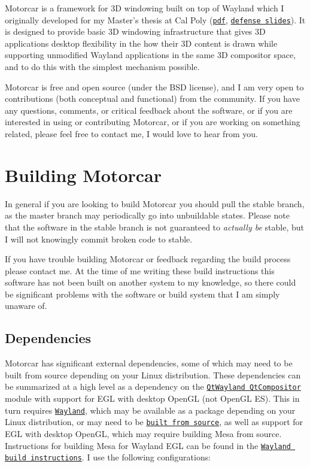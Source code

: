 Motorcar is a framework for 3\-D windowing built on top of Wayland which I originally developed for my Master's thesis at Cal Poly (\href{https://github.com/evil0sheep/MastersThesis/blob/master/thesis.pdf?raw=true}{\tt pdf}, \href{https://docs.google.com/presentation/d/1svgGMxxbfmcHy_KuS5Q9hah8PQOsXqvjBKOoMIzW24Y/edit?usp=sharing}{\tt defense slides}). It is designed to provide basic 3\-D windowing infrastructure that gives 3\-D applications desktop flexibility in the how their 3\-D content is drawn while supporting unmodified Wayland applications in the same 3\-D compositor space, and to do this with the simplest mechanism possible.

Motorcar is free and open source (under the B\-S\-D license), and I am very open to contributions (both conceptual and functional) from the community. If you have any questions, comments, or critical feedback about the software, or if you are interested in using or contributing Motorcar, or if you are working on something related, please feel free to contact me, I would love to hear from you.

\section*{Building Motorcar }

In general if you are looking to build Motorcar you should pull the stable branch, as the master branch may periodically go into unbuildable states. Please note that the software in the stable branch is not guaranteed to {\itshape actually be} stable, but I will not knowingly commit broken code to stable.

If you have trouble building Motorcar or feedback regarding the build process please contact me. At the time of me writing these build instructions this software has not been built on another system to my knowledge, so there could be significant problems with the software or build system that I am simply unaware of.

\subsection*{Dependencies }

Motorcar has significant external dependencies, some of which may need to be built from source depending on your Linux distribution. These dependencies can be summarized at a high level as a dependency on the \href{http://qt-project.org/wiki/QtWayland}{\tt Qt\-Wayland Qt\-Compositor} module with support for E\-G\-L with desktop Open\-G\-L (not Open\-G\-L E\-S). This in turn requires \href{http://wayland.freedesktop.org/}{\tt Wayland}, which may be available as a package depending on your Linux distribution, or may need to be \href{http://wayland.freedesktop.org/building.html}{\tt built from source}, as well as support for E\-G\-L with desktop Open\-G\-L, which may require building Mesa from source. Instructions for building Mesa for Wayland E\-G\-L can be found in the \href{http://wayland.freedesktop.org/building.html}{\tt Wayland build instructions}. I use the following configurations\-:


